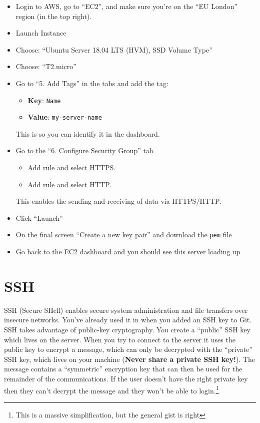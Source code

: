 \begin{itemize}
    \item Login to AWS, go to ``EC2'', and make sure you're on the ``EU London'' region (in the top right).
    \item Launch Instance
    \item Choose: ``Ubuntu Server 18.04 LTS (HVM), SSD Volume Type''
    \item Choose: ``T2.micro''
    \item Go to ``5. Add Tags'' in the tabs and add the tag:
        \begin{itemize}
            \item \textbf{Key}: \texttt{Name}
            \item \textbf{Value}: \texttt{my-server-name}
        \end{itemize}
        This is so you can identify it in the dashboard.

    \item Go to the ``6. Configure Security Group'' tab
        \begin{itemize}
            \item Add rule and select HTTPS.
            \item Add rule and select HTTP.
        \end{itemize}
         This enables the sending and receiving of data via HTTPS/HTTP.
    \item Click ``Launch''
    \item On the final screen ``Create a new key pair'' and download the \texttt{pem} file
    \item Go back to the EC2 dashboard and you should see this server loading up
\end{itemize}


\section{SSH}

SSH (Secure SHell) enables secure system administration and file transfers over insecure networks. You've already used it in when you added an SSH key to Git.
\\

SSH takes advantage of public-key cryptography. You create a ``public'' SSH key which lives on the server. When you try to connect to the server it uses the public key to encrypt a message, which can only be decrypted with the ``private'' SSH key, which lives on your machine (\textbf{Never share a private SSH key!}). The message contains a ``symmetric'' encryption key that can then be used for the remainder of the communications. If the user doesn't have the right private key then they can't decrypt the message and they won't be able to login.\footnote{This is a massive simplification, but the general gist is right}
\\

